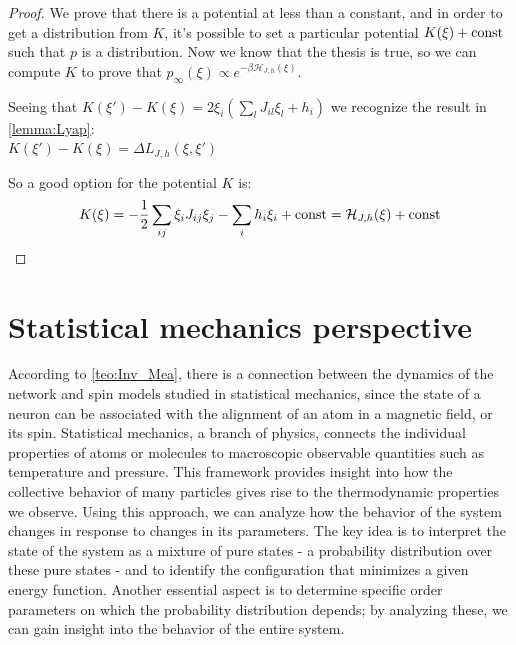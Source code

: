 \begin{theorem}
\begin{proof}
         \noindent We prove that there is a potential at less than a constant, and in order to get a distribution from $K$, it's possible to set a particular potential $K(\xi) + \operatorname{const}$ such that $p$ is a distribution. Now we know that the thesis is true, so we can compute $K$ to prove that $p_{\infty}(\xi) \propto e^{-\beta \mathcal{H}_{J,h}(\xi)}$.

        \noindent Seeing that $K(\xi')-K(\xi) = 2\xi_i(\sum_l J_{il}\xi_l + h_i)$ we recognize the result in \cref{lemma:Lyap}:\\ $K(\xi') - K(\xi) = \Delta L_{J,h}(\xi,\xi')$

        \noindent So a good option for the potential $K$ is:
        \[
            K(\xi) = -\frac12\sum_{ij}\xi_iJ_{ij}\xi_j - \sum_i h_i\xi_i + \operatorname{const} = \mathcal{H}_{J,h}(\xi) + \operatorname{const}
        \]
    \end{proof}
\end{theorem}

\section{Statistical mechanics perspective}
According to \cref{teo:Inv_Mea}, there is a connection between the dynamics of the network and spin models studied in statistical mechanics, since the state of a neuron can be associated with the alignment of an atom in a magnetic field, or its spin. Statistical mechanics, a branch of physics, connects the individual properties of atoms or molecules to macroscopic observable quantities such as temperature and pressure. This framework provides insight into how the collective behavior of many particles gives rise to the thermodynamic properties we observe. Using this approach, we can analyze how the behavior of the system changes in response to changes in its parameters. The key idea is to interpret the state of the system as a mixture of pure states - a probability distribution over these pure states - and to identify the configuration that minimizes a given energy function. Another essential aspect is to determine specific order parameters on which the probability distribution depends; by analyzing these, we can gain insight into the behavior of the entire system.

